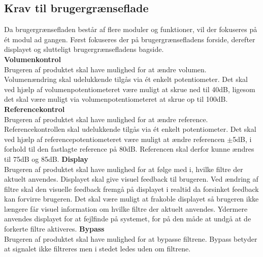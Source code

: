 \subsection{Krav til brugergrænseflade}
\label{Krav_Brugergraenseflade}
%
Da brugergrænsefladen består af flere moduler og funktioner, vil der fokuseres på ét modul ad gangen. Først fokuseres der på brugergrænsefladens forside, derefter displayet og slutteligt brugergrænsefladens bagside. \\
\blankline	
\textbf{Volumenkontrol}\\
Brugeren af produktet skal have mulighed for at ændre volumen. Volumenændring skal udelukkende tilgås via ét enkelt potentiometer. Det skal ved hjælp af volumenpotentiometeret være muligt at skrue ned til 40dB, ligesom det skal være muligt via volumenpotentiometeret at skrue op til 100dB.  
\blankline  	
\textbf{Referencekontrol}\\
Brugeren af produktet skal have mulighed for at ændre reference. Referencekontrollen skal udelukkende tilgås via ét enkelt potentiometer. Det skal ved hjælp af referencepotentiometeret være muligt at ændre referencen $\pm$5dB, i forhold til den fastlagte reference på 80dB. Referencen skal derfor kunne ændres til 75dB og 85dB.   
\blankline	
\textbf{Display}\\
Brugeren af produktet skal have mulighed for at følge med i, hvilke filtre der aktuelt anvendes. Displayet skal give visuel feedback til brugeren. Ved ændring af filtre skal den visuelle feedback fremgå på displayet i realtid da forsinket feedback kan forvirre brugeren. Det skal være muligt at frakoble displayet så brugeren ikke længere får visuel information om hvilke filtre der aktuelt anvendes. Ydermere anvendes displayet for at fejlfinde på systemet, for på den måde at undgå at de forkerte filtre aktiveres.         
\blankline		
\textbf{Bypass}\\
Brugeren af produktet skal have mulighed for at bypasse filtrene. Bypass betyder at signalet ikke filtreres men i stedet ledes uden om filtrene.   
%
